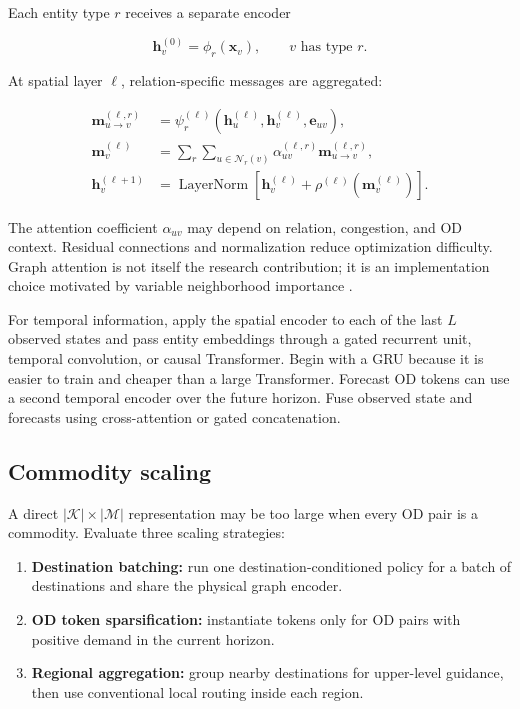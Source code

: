 \documentclass[11pt]{article}
\newcommand{\K}{\mathcal{K}}
\newcommand{\vect}[1]{\bm{#1}}
\begin{document}
Each entity type \(r\) receives a separate encoder

\begin{equation}
  \vect{h}_v^{(0)}
  = \phi_r(\vect{x}_v),
  \qquad v\text{ has type }r.
\end{equation}

At spatial layer \(\ell\), relation-specific messages are aggregated:

\begin{align}
  \vect{m}_{u\rightarrow v}^{(\ell,r)}
    &= \psi_r^{(\ell)}
       (\vect{h}_u^{(\ell)},\vect{h}_v^{(\ell)},\vect{e}_{uv}),
  \\
  \vect{m}_v^{(\ell)}
    &= \sum_r\sum_{u\in\mathcal{N}_r(v)}
       \alpha_{uv}^{(\ell,r)}\vect{m}_{u\rightarrow v}^{(\ell,r)},
  \\
  \vect{h}_v^{(\ell+1)}
    &= \operatorname{LayerNorm}
       \left[
         \vect{h}_v^{(\ell)}
         + \rho^{(\ell)}(\vect{m}_v^{(\ell)})
       \right].
  \label{eq:message-passing}
\end{align}

The attention coefficient \(\alpha_{uv}\) may depend on relation, congestion, and OD
context.  Residual connections and normalization reduce optimization difficulty.
Graph attention is not itself the research contribution; it is an implementation
choice motivated by variable neighborhood importance \citep{velickovic2018}.

For temporal information, apply the spatial encoder to each of the last \(L\) observed
states and pass entity embeddings through a gated recurrent unit, temporal convolution,
or causal Transformer.  Begin with a GRU because it is easier to train and cheaper than
a large Transformer.  Forecast OD tokens can use a second temporal encoder over the
future horizon.  Fuse observed state and forecasts using cross-attention or gated
concatenation.

\subsection{Commodity scaling}

A direct \(|\K|\times|\mathcal{M}|\) representation may be too large when every OD pair
is a commodity.  Evaluate three scaling strategies:

\begin{enumerate}[leftmargin=1.5em]
  \item \textbf{Destination batching:} run one destination-conditioned policy for a
  batch of destinations and share the physical graph encoder.
  \item \textbf{OD token sparsification:} instantiate tokens only for OD pairs with
  positive demand in the current horizon.
  \item \textbf{Regional aggregation:} group nearby destinations for upper-level
  guidance, then use conventional local routing inside each region.
\end{enumerate}
\end{document}

